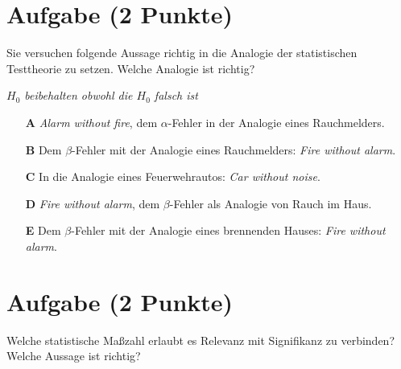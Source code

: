 \documentclass[a4paper, 9pt]{scrartcl}\usepackage[]{graphicx}\usepackage[]{xcolor}
\begin{document}

\section{Aufgabe \hfill (2 Punkte)}



Sie versuchen folgende Aussage richtig in die Analogie der statistischen Testtheorie zu setzen. Welche Analogie ist richtig?

\begin{center}
\textit{$H_0$ beibehalten obwohl die $H_0$ falsch ist}
\end{center}



\begin{enumerate}
\item [\textbf{A} \msquare] \textit{Alarm without fire}, dem $\alpha$-Fehler in der Analogie eines Rauchmelders.
\item [\textbf{B} \msquare] Dem $\beta$-Fehler mit der Analogie eines Rauchmelders: \textit{Fire without alarm}.
\item [\textbf{C} \msquare] In die Analogie eines Feuerwehrautos: \textit{Car without noise}.
\item [\textbf{D} \msquare] \textit{Fire without alarm}, dem $\beta$-Fehler als Analogie von Rauch im Haus.
\item [\textbf{E} \msquare] Dem $\beta$-Fehler mit der Analogie eines brennenden Hauses: \textit{Fire without alarm}.
\end{enumerate}

\section{Aufgabe \hfill (2 Punkte)}



Welche statistische Maßzahl erlaubt es Relevanz mit Signifikanz zu verbinden? Welche Aussage ist richtig?
\end{document}
